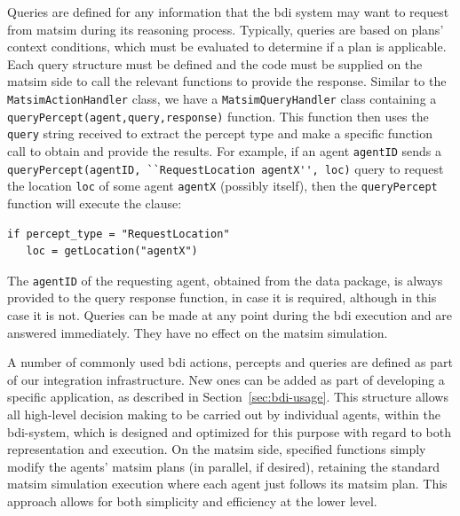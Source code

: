 Queries are defined for any information that the \gls{bdi} system may want
to request from \gls{matsim} during its reasoning process. Typically, queries
are based on plans' context conditions, which must be evaluated
to determine if a plan is applicable. Each query structure must be
defined and the code must be supplied on the \gls{matsim} side to call the
relevant functions to provide the response. 
Similar to the \lstinline{MatsimActionHandler} class, we have a
\lstinline{MatsimQueryHandler} 
class containing a \lstinline{queryPercept(agent,query,response)}
function.
This function then uses the \lstinline{query} string received to extract the
percept type and make a specific function call to obtain and provide the
results. For example, if an agent \lstinline{agentID} sends a
\lstinline{queryPercept(agentID, ``RequestLocation agentX'', loc)} query to
request the location \lstinline{loc} of some agent \lstinline{agentX}
(possibly itself), then the
\lstinline{queryPercept} 
function will execute the clause:
\begin{lstlisting}
if percept_type = "RequestLocation"
   loc = getLocation("agentX")
\end{lstlisting}
The \lstinline{agentID} of
the requesting agent, obtained from the data package, is always
provided to the query response function, in case it is required, 
although in this case it is not.
Queries can be made at any point
during the \gls{bdi} execution and are answered immediately. They 
have no effect on the \gls{matsim} simulation.

A number of commonly used \gls{bdi} actions, percepts and queries are
defined as part of our integration infrastructure. New ones can be
added as part of developing a specific application, as described in
Section~\ref{sec:bdi-usage}.
%
This structure allows all high-level decision making to be carried out by 
individual agents, within the \gls{bdi}-system, which is designed and
optimized for this purpose with regard to both representation and
execution. On the \gls{matsim} side, specified functions simply modify the
agents' \gls{matsim} plans (in parallel, if desired), retaining the standard
\gls{matsim} simulation execution where each agent just follows its \gls{matsim}
plan.  This approach allows for both simplicity and efficiency at the
lower level.

